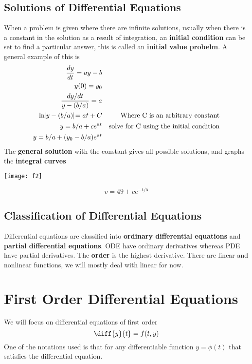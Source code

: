 \documentclass[11pt]{article}
\theoremstyle{definition}
\begin{document}
	\subsection{Solutions of Differential Equations}
	When a problem is given where there are infinite solutions, usually when there is a constant in the solution as a result of integration, an \textbf{initial condition} can be set to find a particular answer, this is called an \textbf{initial value probelm}. A general example of this is
	\begin{align*}
	\dfrac{dy}{dt} = ay - b \\
	y(0) = y_0 \\
	\frac{dy/dt}{y-(b/a)} = a\\
	\ln{ \vline y-(b/a) \vline} = at + C && \text{Where C is an arbitrary constant}\\ 
	y = b/a + ce^{at} && \text{solve for C using the initial condition}\\
	y = b/a + (y_0 - b/a)e^{at}
	\end{align*}
	The \textbf{general solution} with the constant gives all possible solutions, and graphs the \textbf{integral curves} 
	\begin{center}
		\texttt{[image: f2]}
	\end{center}
	$$v = 49 + ce^{-t/5}$$
	\subsection{Classification of Differential Equations}
	Differential equations are classified into \textbf{ordinary differential equations} and \textbf{partial differential equations}. ODE have ordinary derivatives whereas PDE have partial derivatives. The \textbf{order} is the highest derivative. There are linear and nonlinear functions, we will mostly deal with linear for now. 
	\pagebreak
	\section{First Order Differential Equations}
	We will focus on differential equations of first order 
	$$\diff{y}{t} = f(t,y)$$
	One of the notations used is that for any differentiable function $y=\phi(t)$ that satisfies the differential equation. 
\end{document}
